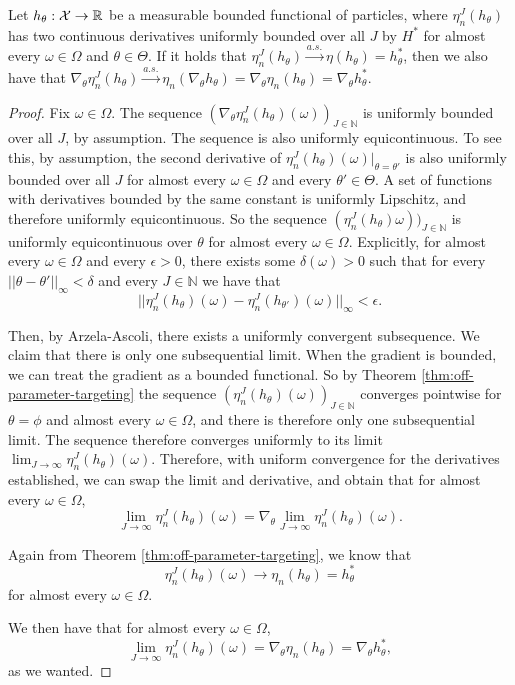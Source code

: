 \begin{thm}
    Let $h_\theta : {\mathcal{X}} \to \mathbb{R}$ be a measurable bounded functional of particles, where $\eta_n^J(h_\theta)$ has two continuous derivatives uniformly bounded over all $J$ by $H^*$ for almost every $\omega\in\Omega$ and $\theta \in \Theta$. If it holds that $\eta_n^J(h_\theta) \stackrel{a.s.}{\to} \eta(h_\theta) = h^*_\theta$, then we also have that $\nabla_\theta \eta_n^J(h_\theta)  \stackrel{a.s.}{\to} \eta_n(\nabla_\theta h_\theta) = \nabla_\theta \eta_n(h_\theta) = \nabla_\theta h^*_\theta$. 
\end{thm}
\begin{proof}
    Fix $\omega \in \Omega$. The sequence $(\nabla_\theta \eta_n^J(h_\theta)(\omega))_{J \in \mathbb{N}}$ is uniformly bounded over all $J$, by assumption. The sequence is also uniformly equicontinuous. To see this, by assumption, the second derivative of $\eta_n^J(h_\theta)(\omega)|_{\theta=\theta'}$ is also uniformly bounded over all $J$ for almost every $\omega\in \Omega$ and every $\theta' \in \Theta$. A set of functions with derivatives bounded by the same constant is uniformly Lipschitz, and therefore uniformly equicontinuous. So the sequence $(\eta_n^J(h_\theta)\omega))_{J \in \mathbb{N}}$ is uniformly equicontinuous over $\theta$ for almost every $\omega \in \Omega$. 
    Explicitly, for almost every $\omega \in \Omega$ and every $\epsilon>0$, there exists some $\delta(\omega)>0$ such that for every $||\theta - \theta'||_{\infty}<\delta$ and every $J \in \mathbb{N}$ we have that
    $$||\eta_n^J(h_\theta)(\omega)-\eta_n^J(h_{\theta'})(\omega)||_\infty < \epsilon.$$


    Then, by Arzela-Ascoli, there exists a uniformly convergent subsequence. We claim that there is only one subsequential limit. When the gradient is bounded, we can treat the gradient as a bounded functional. So by Theorem \ref{thm:off-parameter-targeting} the sequence $(\eta_n^J(h_\theta)(\omega))_{J \in \mathbb{N}}$ converges pointwise for $\theta=\phi$ and almost every $\omega \in \Omega$, and there is therefore only one subsequential limit. The sequence therefore converges uniformly to its limit $\lim_{J \to \infty} \eta_n^J(h_\theta)(\omega).$ Therefore, with uniform convergence for the derivatives established, we can swap the limit and derivative, and obtain that for almost every $\omega \in \Omega$, 
    $$\lim_{J \to \infty} \eta_n^J(h_\theta)(\omega) = \nabla_\theta \lim_{J \to \infty} \eta_n^J(h_\theta)(\omega).$$

    Again from Theorem \ref{thm:off-parameter-targeting}, we know that
    $$\eta_n^J(h_\theta)(\omega) \to \eta_n(h_\theta) = h^*_\theta$$ for almost every $\omega\in\Omega$.

    We then have that for almost every $\omega \in \Omega$, 
    $$\lim_{J \to \infty} \eta_n^J(h_\theta)(\omega) = \nabla_\theta \eta_n(h_\theta) = \nabla_\theta h^*_\theta,$$
    as we wanted. 
    
\end{proof}

